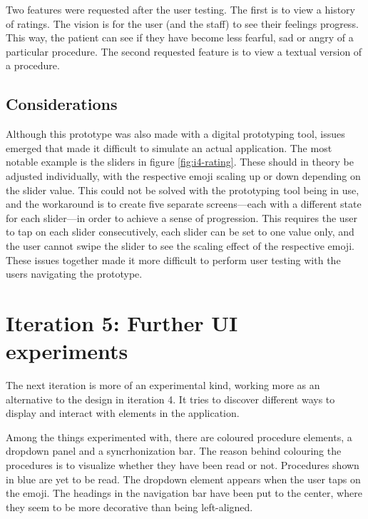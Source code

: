 Two features were requested after the user testing. The first is to view a history of ratings. The vision is for the user (and the staff) to see their feelings progress. This way, the patient can see if they have become less fearful, sad or angry of a particular procedure. The second requested feature is to view a textual version of a procedure.

\subsection{Considerations}

Although this prototype was also made with a digital prototyping tool, issues emerged that made it difficult to simulate an actual application. The most notable example is the sliders in figure \ref{fig:i4-rating}. These should in theory be adjusted individually, with the respective emoji scaling up or down depending on the slider value. This could not be solved with the prototyping tool being in use, and the workaround is to create five separate screens---each with a different state for each slider---in order to achieve a sense of progression. This requires the user to tap on each slider consecutively, each slider can be set to one value only, and the user cannot swipe the slider to see the scaling effect of the respective emoji. These issues together made it more difficult to perform user testing with the users navigating the prototype.

\section{Iteration 5: Further UI experiments}
\label{sec:iteration5}

The next iteration is more of an experimental kind, working more as an alternative to the design in iteration 4. It tries to discover different ways to display and interact with elements in the application.

Among the things experimented with, there are coloured procedure elements, a dropdown panel and a syncrhonization bar. The reason behind colouring the procedures is to visualize whether they have been read or not. Procedures shown in blue are yet to be read. The dropdown element appears when the user taps on the emoji. The headings in the navigation bar have been put to the center, where they seem to be more decorative than being left-aligned.

